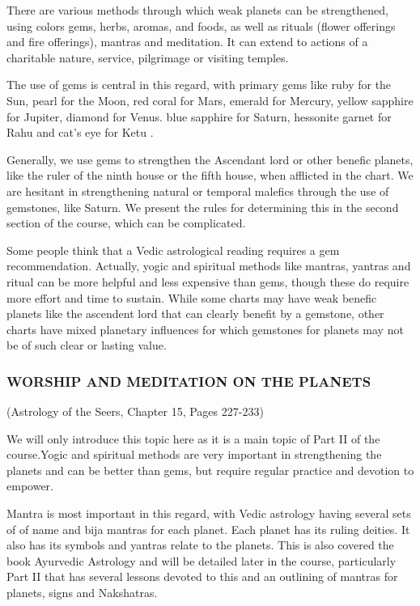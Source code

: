  

There are various methods through which weak planets can be strengthened, using colors gems, herbs, aromas, and foods, as well as rituals (flower offerings and fire offerings), mantras and meditation. It can extend to actions of a charitable nature, service, pilgrimage or visiting temples.

The use of gems is central in this regard, with primary gems like ruby for the Sun, pearl for the Moon, red coral for Mars, emerald for Mercury, yellow sapphire for Jupiter, diamond for Venus. blue sapphire for Saturn, hessonite garnet for Rahu and cat’s eye for Ketu .

 

Generally, we use gems to strengthen the Ascendant lord or other benefic planets, like the ruler of the ninth house or the fifth house, when afflicted in the chart. We are hesitant in strengthening natural or temporal malefics through the use of gemstones, like Saturn. We present the rules for determining this in the second section of the course, which can be complicated.

Some people think that a Vedic astrological reading requires a gem recommendation. Actually, yogic and spiritual methods like mantras, yantras and ritual can be more helpful and less expensive than gems, though these do require more effort and time to sustain. While some charts may have weak benefic planets like the ascendent lord that can clearly benefit by a gemstone, other charts have mixed planetary influences for which gemstones for planets may not be of such clear or lasting value.

 

\subsubsection{WORSHIP AND MEDITATION ON THE PLANETS} (Astrology of the Seers, Chapter 15, Pages 227-233)

 

We will only introduce this topic here as it is a main topic of Part II of the course.Yogic and spiritual methods are very important in strengthening the planets and can be better than gems, but require regular practice and devotion to empower.

 

Mantra is most important in this regard, with Vedic astrology having several sets of of name and bija mantras for each planet. Each planet has its ruling deities. It also has its symbols and yantras relate to the planets. This is also covered the book Ayurvedic Astrology and will be detailed later in the course, particularly Part II that has several lessons devoted to this and an outlining of mantras for planets, signs and Nakshatras.


